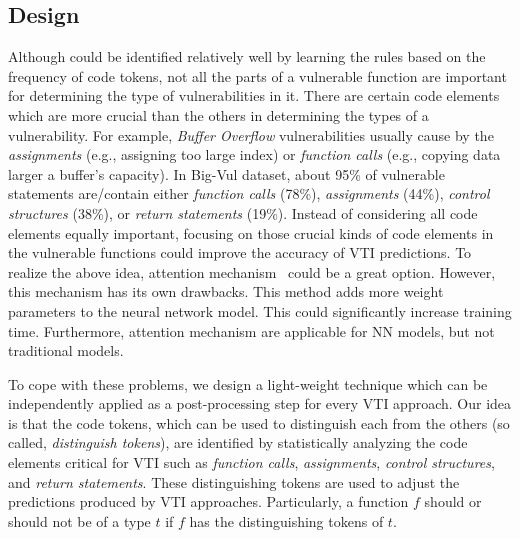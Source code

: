 \subsection{Design}
Although \vts could be identified relatively well by learning the rules based on the frequency of code tokens, not all the parts of a vulnerable function are important for determining the type of vulnerabilities in it. 
%
%
There are certain code elements which are more crucial than the others in determining the types of a vulnerability. For example, \textit{Buffer Overflow} vulnerabilities usually cause by the \textit{assignments} (e.g., assigning too large index) or \textit{function calls} (e.g., copying data larger a buffer's capacity). In Big-Vul dataset, about 95\% of vulnerable statements are/contain either \textit{function calls} (78\%), \textit{assignments} (44\%), \textit{control structures} (38\%), or \textit{return statements} (19\%). Instead of considering all code elements equally important, focusing on those crucial kinds of code elements in the vulnerable functions could improve the accuracy of VTI predictions.
%
To realize the above idea, attention mechanism~\cite{attention} could be a great option. However, this mechanism has its own drawbacks. This method adds more weight parameters to the neural network model. This could significantly increase training time. Furthermore, attention mechanism are applicable for NN models, but not traditional models. 


To cope with these problems, we design a light-weight technique which can be independently applied as a post-processing step for every VTI approach. 
%
Our idea is that the code tokens, which can be used to distinguish each \vt from the others (so called, \textit{distinguish tokens}), are identified by statistically analyzing the code elements critical for VTI such as \textit{function calls}, \textit{assignments}, \textit{control structures}, and \textit{return statements}.  
%
These distinguishing tokens are used to adjust the predictions produced by VTI approaches. Particularly, a function $f$ should or should not be of a type $t$ if $f$ has the distinguishing tokens of $t$.


